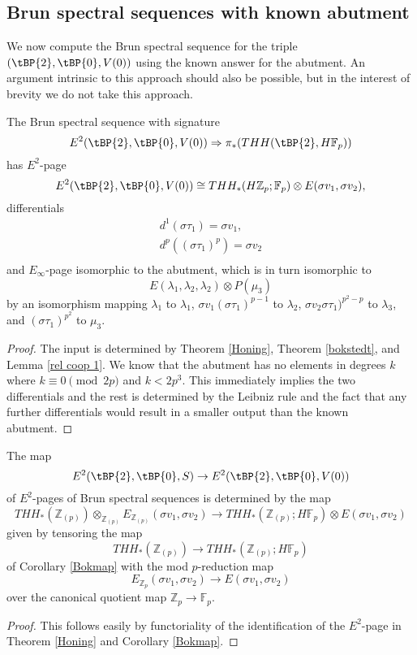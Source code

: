 \subsection{Brun spectral sequences with known abutment}
We now compute the Brun spectral sequence for the triple $(\tBP{2},\tBP{0},V(0))$ using the known answer for the abutment. An argument intrinsic to this approach should also be possible, but in the interest of brevity we do not take this approach. 
\begin{lem}
The Brun spectral sequence with signature
\[ E^2(\tBP{2},\tBP{0},V(0))\Rightarrow \pi_*(THH(\tBP{2},H\mathbb{F}_p))\]
has $E^2$-page
\[ E^2(\tBP{2},\tBP{0},V(0))\cong THH_*(H\mathbb{Z}_p;\mathbb{F}_p)\otimes E(\sigma v_1,\sigma v_2), \]
differentials
\begin{align*}
	d^1(\sigma \tau_1) =\sigma v_1,\\
	d^{p}((\sigma \tau_1)^p) = \sigma v_2 \\
\end{align*}
and $E_{\infty}$-page isomorphic to the abutment, which is in turn isomorphic to 
\[ E(\lambda_1,\lambda_2,\lambda_2)\otimes P(\mu_3) \]
by an isomorphism mapping $\lambda_1$ to $\lambda_1$, $\sigma v_1(\sigma\tau_1)^{p-1}$ to $\lambda_2$, $\sigma v_2\sigma \tau_1)^{p^2-p}$ to $\lambda_3$, and $(\sigma \tau_1)^{p^2}$ to $\mu_3$. 
\end{lem}
\begin{proof}
The input is determined by Theorem \ref{Honing}, Theorem \ref{bokstedt}, and Lemma \ref{rel coop 1}. 
We know that the abutment has no elements in degrees $k$ where $k\equiv 0 \pmod{2p}$ and $k<2p^3$. This immediately implies the two differentials and the rest is determined by the Leibniz rule and the fact that any further differentials would result in a smaller output than the known abutment. 
\end{proof}
\begin{lem}\label{map of Brun ss}
The map 
\[ E^2(\tBP{2},\tBP{0},S)\to E^2(\tBP{2},\tBP{0},V(0) )\]
of $E^2$-pages of Brun spectral sequences is determined by the map 
\[THH_*(\mathbb{Z}_{(p)})\otimes_{\mathbb{Z}_{(p)}}E_{\mathbb{Z}_{(p)}}(\sigma v_1,\sigma v_2) \to THH_*(\mathbb{Z}_{(p)};H\mathbb{F}_p)\otimes E(\sigma v_1,\sigma v_2) \]
given by tensoring the map 
\[THH_*(\mathbb{Z}_{(p)})\to THH_*(\mathbb{Z}_{(p)};H\mathbb{F}_p)\]
of Corollary \ref{Bokmap} with the mod $p$-reduction map 
\[ E_{\mathbb{Z}_p}(\sigma v_1,\sigma v_2)\to E(\sigma v_1,\sigma v_2) \]
over the canonical quotient map $\mathbb{Z}_p\to \mathbb{F}_p$. 
\end{lem}
\begin{proof}
This follows easily by functoriality of the identification of the $E^2$-page in Theorem \ref{Honing} and Corollary \ref{Bokmap}. 
\end{proof}

